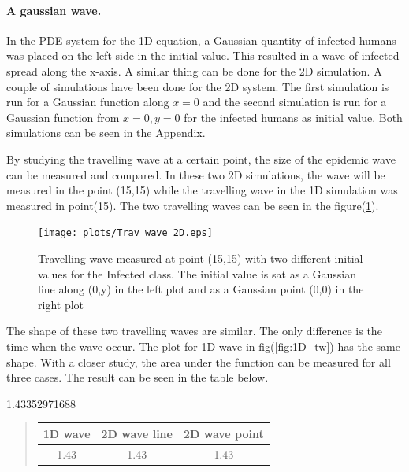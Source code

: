 \documentclass[%
twoside,                 %
final,                   %
10pt]{article}
\begin{document}
\paragraph{A gaussian wave.}
In the PDE system for the 1D equation, a Gaussian quantity of infected humans was placed on the left side in the initial value. This resulted in a wave of infected spread along the x-axis. A similar thing can be done for the 2D simulation. A couple of simulations have been done for the 2D system. The first simulation is run for a Gaussian function along $x=0$ and the second simulation is run for a Gaussian function from $x=0,y=0$ for the infected humans as initial value. Both simulations can be seen in the Appendix.  

By studying the travelling wave at a certain point, the size of the epidemic wave can be measured and compared. In these two 2D simulations, the wave will be measured in the point (15,15) while the travelling wave in the 1D simulation was measured in point(15). The two travelling waves can be seen in the figure(\ref{fig:2D_trav_wave}).


\begin{figure}[ht]
  \centerline{\texttt{[image: plots/Trav\_wave\_2D.eps]}}
  \caption{
  \label{fig:2D_trav_wave} Travelling wave measured at point (15,15) with two different initial values for the Infected class. The initial value is sat as a Gaussian line along (0,y) in the left plot and as a Gaussian point (0,0) in the right plot
  }
\end{figure}


The shape of these two travelling waves are similar. The only difference is the time when the wave occur. The plot for 1D wave in fig(\ref{fig:1D_tw}) has the same shape. With a closer study, the area under the function can be measured for all three cases. The result can be seen in the table below.   

1.43352971688

\begin{quote}
\begin{tabular}{ccc}
\hline
\multicolumn{1}{c}{ 1D wave } & \multicolumn{1}{c}{ 2D wave line } & \multicolumn{1}{c}{ 2D wave point } \\
\hline
1.43          & 1.43          & 1.43          \\
\hline
\end{tabular}
\end{quote}
\end{document}
